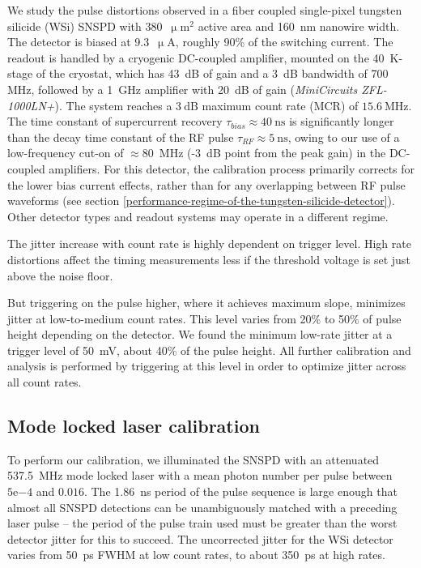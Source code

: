 \documentclass[11pt]{caltech_thesis} %
\begin{document}
We study the pulse distortions observed in a fiber coupled single-pixel tungsten silicide (WSi) SNSPD with 380~$\mathrm{\upmu m^2}$ active area and 160~nm nanowire width. The detector is biased at 9.3~$\mathrm{\upmu A}$, roughly 90\% of the switching current. The readout is handled by a cryogenic DC-coupled amplifier, mounted on the 40~K-stage of the cryostat, which has 43~dB of gain and a 3~dB bandwidth of 700 MHz, followed by a 1~GHz amplifier with 20~dB of gain (\emph{MiniCircuits ZFL-1000LN+}). The system reaches a $3~\mathrm{dB}$ maximum count rate (MCR) of $15.6~\mathrm{MHz}$. The time constant of supercurrent recovery $\tau_{bias} \approx 40~\mathrm{ns}$ is significantly longer than the decay time constant of the RF pulse $\tau_{RF} \approx 5~\mathrm{ns}$, owing to our use of a low-frequency cut-on of $\approx 80$~MHz (-3~dB point from the peak gain) in the DC-coupled amplifiers. For this detector, the calibration process primarily corrects for the lower bias current effects, rather than for any overlapping between RF pulse waveforms (see section \ref{performance-regime-of-the-tungsten-silicide-detector}). Other detector types and readout systems may operate in a different regime.

The jitter increase with count rate is highly dependent on trigger level. High rate distortions affect the timing measurements less if the threshold voltage is set just above the noise floor.

But triggering on the pulse higher, where it achieves maximum slope, minimizes jitter at low-to-medium count rates. This level varies from 20\% to 50\% of pulse height depending on the detector. We found the minimum low-rate jitter at a trigger level of 50~mV, about 40\% of the pulse height. All further calibration and analysis is performed by triggering at this level in order to optimize jitter across all count rates.

\hypertarget{mode-locked-laser-calibration}{%
\subsection{Mode locked laser calibration}\label{mode-locked-laser-calibration}}

To perform our calibration, we illuminated the SNSPD with an attenuated 537.5~MHz mode locked laser with a mean photon number per pulse between $5\mathrm{e}{-4}$ and $0.016$. The 1.86~ns period of the pulse sequence is large enough that almost all SNSPD detections can be unambiguously matched with a preceding laser pulse -- the period of the pulse train used must be greater than the worst detector jitter for this to succeed. The uncorrected jitter for the WSi detector varies from 50~ps FWHM at low count rates, to about 350~ps at high rates.
\end{document}

